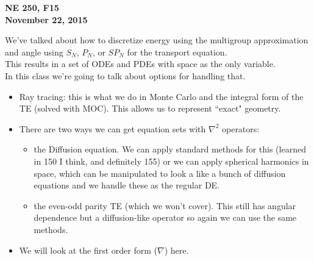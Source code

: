 \documentclass[12pt]{article}
\begin{document}
\begin{center}
{\bf NE 250, F15\\
November 22, 2015 
}
\end{center}

We've talked about how to discretize energy using the multigroup approximation and angle using $S_N$, $P_N$, or $SP_N$ for the transport equation. \\
This results in a set of ODEs and PDEs with space as the only variable.\\
In this class we're going to talk about options for handling that.
\begin{itemize}
\item Ray tracing: this is what we do in Monte Carlo and the integral form of the TE (solved with MOC). This allows us to represent ``exact" geometry.
\item There are two ways we can get equation sets with $\nabla^2$ operators: 
  \begin{itemize}
  \item the Diffusion equation. We can apply standard methods for this (learned in 150 I think, and definitely 155) or we can apply spherical harmonics in space, which can be manipulated to look a like a bunch of diffusion equations and we handle these as the regular DE.
  \item the even-odd parity TE (which we won't cover). This still has angular dependence but a diffusion-like operator so again we can use the same methods.
  \end{itemize}
\item We will look at the first order form ($\nabla$) here. 
\end{itemize}
\end{document}
